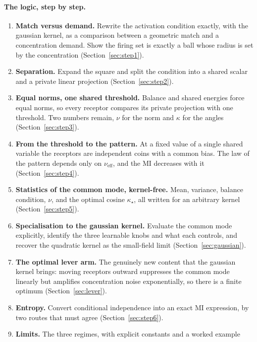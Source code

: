 \documentclass[11pt,a4paper]{article}
\newcommand{\nueff}{\nu_{\mathrm{eff}}}
\begin{document}
\paragraph{The logic, step by step.}
\begin{enumerate}
  \item \textbf{Match versus demand.} Rewrite the activation condition exactly, with the
        gaussian kernel, as a comparison between a geometric match and a concentration
        demand. Show the firing set is exactly a ball whose radius is set by the
        concentration (Section~\ref{sec:step1}).
  \item \textbf{Separation.} Expand the square and split the condition into a shared
        scalar and a private linear projection (Section~\ref{sec:step2}).
  \item \textbf{Equal norms, one shared threshold.} Balance and shared energies force
        equal norms, so every receptor compares its private projection with one
        threshold. Two numbers remain, $\nu$ for the norm and $\kappa$ for the angles
        (Section~\ref{sec:step3}).
  \item \textbf{From the threshold to the pattern.} At a fixed value of a single shared
        variable the receptors are independent coins with a common bias. The law of the
        pattern depends only on $\nueff$, and the MI decreases with it
        (Section~\ref{sec:step4}).
  \item \textbf{Statistics of the common mode, kernel-free.} Mean, variance, balance
        condition, $\nu$, and the optimal cosine $\kappa_\star$, all written for an
        arbitrary kernel (Section~\ref{sec:step5}).
  \item \textbf{Specialisation to the gaussian kernel.} Evaluate the common mode
        explicitly, identify the three learnable knobs and what each controls, and
        recover the quadratic kernel as the small-field limit
        (Section~\ref{sec:gaussian}).
  \item \textbf{The optimal lever arm.} The genuinely new content that the gaussian
        kernel brings: moving receptors outward suppresses the common mode linearly but
        amplifies concentration noise exponentially, so there is a finite optimum
        (Section~\ref{sec:lever}).
  \item \textbf{Entropy.} Convert conditional independence into an exact MI expression,
        by two routes that must agree (Section~\ref{sec:step6}).
  \item \textbf{Limits.} The three regimes, with explicit constants and a worked example

\end{enumerate}
\end{document}

